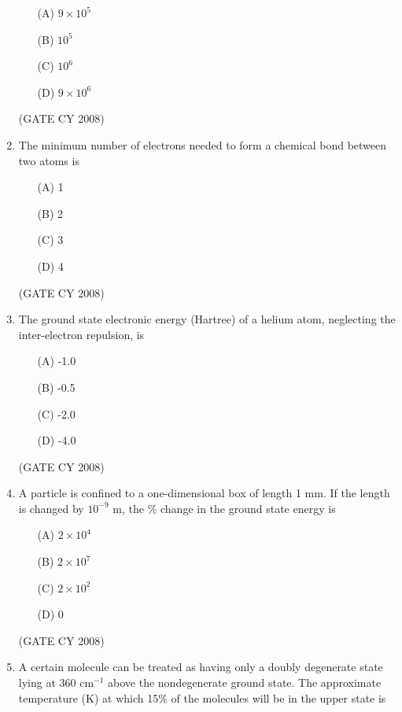 \documentclass[12pt]{article}
\begin{document}
\begin{enumerate}
\begin{enumerate}
\item[(A)] $9 \times 10^5$
\item[(B)] $10^5$
\item[(C)] $10^6$
\item[(D)] $9 \times 10^6$
\end{enumerate}    \hfill{(GATE CY 2008)}




\item The minimum number of electrons needed to form a chemical bond between two atoms is

\begin{enumerate}
\item[(A)] 1
\item[(B)] 2
\item[(C)] 3
\item[(D)] 4
\end{enumerate}    \hfill{(GATE CY 2008)}




\item The ground state electronic energy (Hartree) of a helium atom, neglecting the inter-electron repulsion, is

\begin{enumerate}
\item[(A)] -1.0
\item[(B)] -0.5
\item[(C)] -2.0
\item[(D)] -4.0
\end{enumerate}    \hfill{(GATE CY 2008)}




\item A particle is confined to a one-dimensional box of length 1 mm. If the length is changed by $10^{-9}$ m, the \% change in the ground state energy is

\begin{enumerate}
\item[(A)] $2 \times 10^4$
\item[(B)] $2 \times 10^7$
\item[(C)] $2 \times 10^2$
\item[(D)] 0
\end{enumerate}    \hfill{(GATE CY 2008)}




\item A certain molecule can be treated as having only a doubly degenerate state lying at 360 cm$^{-1}$ above the nondegenerate ground state. The approximate temperature (K) at which 15\% of the molecules will be in the upper state is


\end{enumerate}
\end{document}
